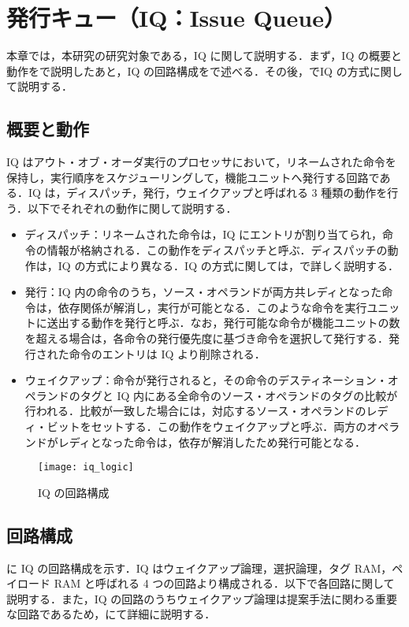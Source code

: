 
\chapter{発行キュー（IQ：Issue Queue）}
\label{sec:basic_IQ}
本章では，本研究の研究対象である，IQ に関して説明する．まず，IQ の概要と動作をで説明したあと，IQ の回路構成をで述べる．その後，でIQ の方式に関して説明する．

\section{概要と動作}
\label{sec:iq_abst}
IQ はアウト・オブ・オーダ実行のプロセッサにおいて，リネームされた命令を保持し，実行順序をスケジューリングして，機能ユニットへ発行する回路である．IQ は，ディスパッチ，発行，ウェイクアップと呼ばれる 3 種類の動作を行う．以下でそれぞれの動作に関して説明する．

\begin{itemize}
  \item ディスパッチ：リネームされた命令は，IQ にエントリが割り当てられ，命令の情報が格納される．この動作をディスパッチと呼ぶ．ディスパッチの動作は，IQ の方式により異なる．IQ の方式に関しては，で詳しく説明する．
  \item 発行：IQ 内の命令のうち，ソース・オペランドが両方共レディとなった命令は，依存関係が解消し，実行が可能となる．このような命令を実行ユニットに送出する動作を発行と呼ぶ．なお，発行可能な命令が機能ユニットの数を超える場合は，各命令の発行優先度に基づき命令を選択して発行する．発行された命令のエントリは IQ より削除される． 
  \item ウェイクアップ：命令が発行されると，その命令のデスティネーション・オペランドのタグと IQ 内にある全命令のソース・オペランドのタグの比較が行われる．比較が一致した場合には，対応するソース・オペランドのレディ・ビットをセットする．この動作をウェイクアップと呼ぶ．両方のオペランドがレディとなった命令は，依存が解消したため発行可能となる．
\end{itemize}

\begin{figure}[thb]
  \centering
  \texttt{[image: iq\_logic]}
  \caption{IQ の回路構成}
  \label{fig:iq_logic}
\end{figure}

\section{回路構成}
\label{sec:iq_circuit}
に IQ の回路構成を示す．IQ はウェイクアップ論理，選択論理，タグ RAM，ペイロード RAM と呼ばれる 4 つの回路より構成される．以下で各回路に関して説明する．また，IQ の回路のうちウェイクアップ論理は提案手法に関わる重要な回路であるため，にて詳細に説明する．


